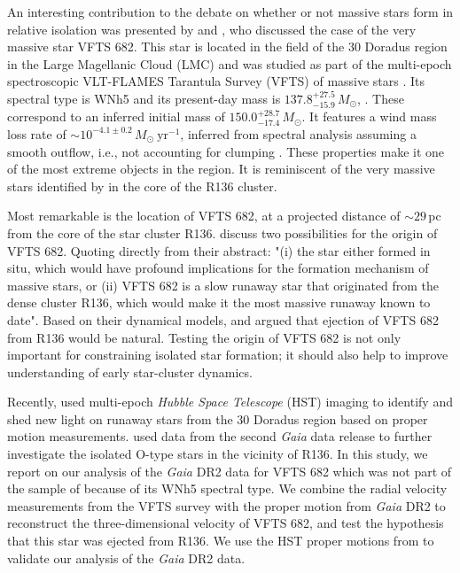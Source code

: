 \documentclass[apjl,twocolumn]{emulateapj}
\begin{document}
An interesting contribution to the debate on whether or not massive
stars form in relative isolation was presented by
\cite{bestenlehner:11} and \cite{bressert:12}, who discussed the case of the very massive star
VFTS 682.  This star is located in the field of the 30 Doradus region
in the Large Magellanic Cloud (LMC) and was studied as part of the
multi-epoch spectroscopic VLT-FLAMES Tarantula Survey (VFTS) of
massive stars \citep{evans:11}. Its spectral type is WNh5 and its 
present-day mass is $137.8^{+27.5}_{-15.9}\,M_\odot$,
\citep{schneider:18}. These correspond to an inferred initial mass of
$150.0^{+28.7}_{-17.4}\,M_\odot$. It features a wind mass loss rate of
$\sim10^{-4.1\pm0.2}\,M_\odot \ \mathrm{yr}^{-1}$, inferred from
spectral analysis assuming a smooth outflow, i.e., not accounting for clumping
\citep[][]{bestenlehner:11}. These properties make it one of the
most extreme objects in the region. It is reminiscent of the very
massive stars %
identified by
\citet{dekoter:97,crowther:10, crowther:16} in the core of the
R136 cluster. 
 
Most remarkable is the location of VFTS 682, at a projected distance of
$\sim$$29$\,pc from the core of the star cluster
R136. \citet{bestenlehner:11} discuss two possibilities for the
origin of VFTS 682. Quoting directly from their abstract: "(i) the
star either formed in situ, which would have profound implications for
the formation mechanism of massive stars, or (ii) VFTS 682 is a slow
runaway star that originated from the dense cluster R136, which would
make it the most massive runaway known to date". Based on their
dynamical models, \citet{fujii:11} and \citet{banerjee:12} argued that
ejection of VFTS 682 from R136 would be natural. Testing the origin of
VFTS 682 is not only important for constraining isolated star
formation; it should also help to improve understanding of early star-cluster dynamics.


Recently, \citet{platais:15,platais:18} used multi-epoch \emph{Hubble Space
Telescope} (HST) imaging to identify and shed new light on runaway stars from
the 30 Doradus region based on proper motion
measurements. \citet{lennon:18} used data from the second \emph{Gaia}
data release \cite[DR2,][]{gaia:16,brown:18} to further investigate
the isolated O-type stars in the vicinity of R136. In this study, we
report on our analysis of the \emph{Gaia} DR2 data for VFTS 682 which
was not part of the sample of \citet{lennon:18} because of its WNh5
spectral type. We combine the radial velocity measurements from the
VFTS survey \citep[][]{evans:11} with the proper motion from
\emph{Gaia} DR2 to reconstruct the three-dimensional velocity of VFTS
682, and test the hypothesis that this star was ejected from R136. We
use the HST proper motions from \citet{platais:18} to validate our
analysis of the \emph{Gaia} DR2 data.
\end{document}
